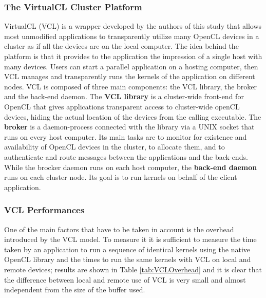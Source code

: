 \subsubsection{The VirtualCL Cluster Platform}
VirtualCL (VCL) is a wrapper developed by the authors of this study that allows most unmodified applications
to transparently utilize many OpenCL devices in a cluster as if all the devices are on the local computer.
The idea behind the platform is that it provides to the application the impression of a single host with many devices. Users can start a parallel application on a hosting computer, then VCL manages and transparently runs
the kernels of the application on different nodes.
VCL is composed of three main components: the VCL library, the broker and the back-end daemon.
The \textbf{VCL library} is a cluster-wide front-end for OpenCL that gives applications transparent access to cluster-wide openCL devices, hiding the actual location of the devices from the calling executable.
The \textbf{broker} is a daemon-process connected with the library via a UNIX socket that runs on every host computer. Its main tasks are to monitor for existence and availability of OpenCL devices in the cluster, to allocate them, and to authenticate and route messages between the applications and the back-ends.
While the brocker daemon runs on each host computer, the \textbf{back-end daemon} runs on each cluster node. Its goal is to run kernels on behalf of the client application.

\subsubsection{VCL Performances}
One of the main factors that have to be taken in account is the overhead introduced by the VCL model. To measure it it is sufficient to measure the time taken by an application to run a sequence of identical kernels using the native OpenCL library and the times to run the same kernels with VCL on local and remote devices; results are shown in Table \ref{tab:VCLOverhead} and it is clear that the difference between local and remote use of VCL is very small and almost independent from the size of the buffer used.\\

